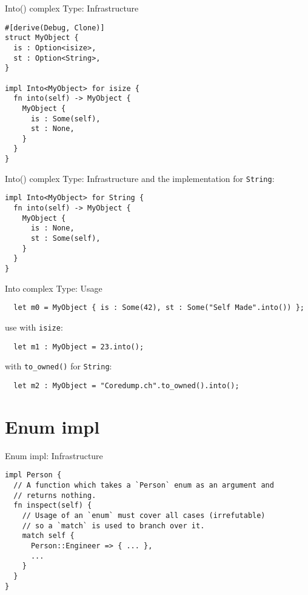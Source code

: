 \documentclass[aspectratio=1610,t]{beamer}
\begin{document}
\begin{frame}[fragile]{Into() complex Type: Infrastructure}
\begin{verbatim}
#[derive(Debug, Clone)]
struct MyObject {
  is : Option<isize>,
  st : Option<String>,
}

impl Into<MyObject> for isize {
  fn into(self) -> MyObject {
    MyObject {
      is : Some(self),
      st : None,
    }
  }
}
\end{verbatim}
\end{frame}

\begin{frame}[fragile]{Into() complex Type: Infrastructure}
and the implementation for \texttt{String}:
\begin{verbatim}
impl Into<MyObject> for String {
  fn into(self) -> MyObject {
    MyObject {
      is : None,
      st : Some(self),
    }
  }
}
\end{verbatim}
\end{frame}


\begin{frame}[fragile]{Into\(\) complex Type: Usage}
  \begin{verbatim}
  let m0 = MyObject { is : Some(42), st : Some("Self Made".into()) };
  \end{verbatim}

\pause

  use with \texttt{isize}:
  \begin{verbatim}
  let m1 : MyObject = 23.into();
  \end{verbatim}

\pause

  with \texttt{to\_owned()} for \texttt{String}:
  \begin{verbatim}
  let m2 : MyObject = "Coredump.ch".to_owned().into();
  \end{verbatim}
\end{frame}




{
\section{Enum impl}
}

\begin{frame}[fragile]{Enum impl: Infrastructure}
\begin{verbatim}
impl Person {
  // A function which takes a `Person` enum as an argument and
  // returns nothing.
  fn inspect(self) {
    // Usage of an `enum` must cover all cases (irrefutable)
    // so a `match` is used to branch over it.
    match self {
      Person::Engineer => { ... },
      ...
    }
  }
}
\end{verbatim}
\end{frame}
\end{document}
